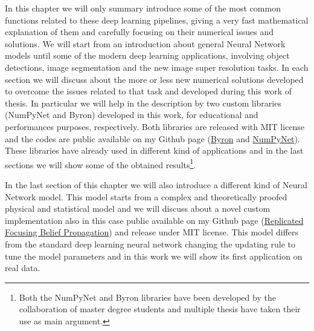 \documentclass{standalone}
\begin{document}
In this chapter we will only summary introduce some of the most common functions related to these deep learning pipelines, giving a very fast mathematical explanation of them and carefully focusing on their numerical issues and solutions.
We will start from an introduction about general Neural Network models until some of the modern deep learning applications, involving object detections, image segmentation and the new image super resolution tasks.
In each section we will discuss about the more or less new numerical solutions developed to overcome the issues related to that task and developed during this work of thesis.
In particular we will help in the description by two custom libraries (\textsf{NumPyNet} and \textsf{Byron}) developed in this work, for educational and performances purposes, respectively.
Both libraries are released with MIT license and the codes are public available on my Github page (\href{https://github.com/Nico-Curti/Byron}{Byron} and \href{https://github.com/Nico-Curti/NumPyNet}{NumPyNet}).
These libraries have already used in different kind of applications and in the last sections we will show some of the obtained results\footnote{
  Both the \textsf{NumPyNet} and \textsf{Byron} libraries have been developed by the collaboration of master degree students and multiple thesis have taken their use as main argument.
}.

In the last section of this chapter we will also introduce a different kind of Neural Network model.
This model starts from a complex and theoretically proofed physical and statistical model and we will discuss about a novel custom implementation also in this case public available on my Github page (\href{https://github.com/Nico-Curti/rFBP}{Replicated Focusing Belief Propagation}) and release under MIT license.
This model differs from the standard deep learning neural network changing the updating rule to tune the model parameters and in this work we will show its first application on real data.
\end{document}
